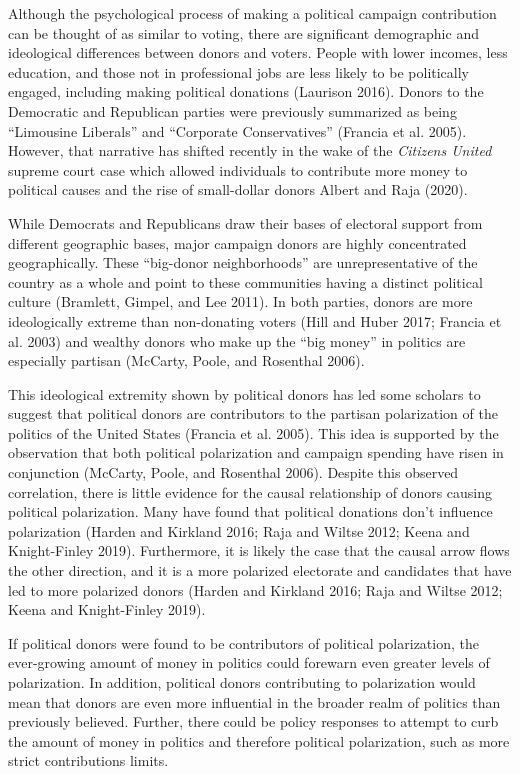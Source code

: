 \documentclass[12pt,]{article}
\begin{document}
Although the psychological process of making a political campaign
contribution can be thought of as similar to voting, there are
significant demographic and ideological differences between donors and
voters. People with lower incomes, less education, and those not in
professional jobs are less likely to be politically engaged, including
making political donations (Laurison 2016). Donors to the Democratic and
Republican parties were previously summarized as being ``Limousine
Liberals'' and ``Corporate Conservatives'' (Francia et al. 2005).
However, that narrative has shifted recently in the wake of the
\emph{Citizens United} supreme court case which allowed individuals to
contribute more money to political causes and the rise of small-dollar
donors Albert and Raja (2020).

While Democrats and Republicans draw their bases of electoral support
from different geographic bases, major campaign donors are highly
concentrated geographically. These ``big-donor neighborhoods'' are
unrepresentative of the country as a whole and point to these
communities having a distinct political culture (Bramlett, Gimpel, and
Lee 2011). In both parties, donors are more ideologically extreme than
non-donating voters (Hill and Huber 2017; Francia et al. 2003) and
wealthy donors who make up the ``big money'' in politics are especially
partisan (McCarty, Poole, and Rosenthal 2006).

This ideological extremity shown by political donors has led some
scholars to suggest that political donors are contributors to the
partisan polarization of the politics of the United States (Francia et
al. 2005). This idea is supported by the observation that both political
polarization and campaign spending have risen in conjunction (McCarty,
Poole, and Rosenthal 2006). Despite this observed correlation, there is
little evidence for the causal relationship of donors causing political
polarization. Many have found that political donations don't influence
polarization (Harden and Kirkland 2016; Raja and Wiltse 2012; Keena and
Knight-Finley 2019). Furthermore, it is likely the case that the causal
arrow flows the other direction, and it is a more polarized electorate
and candidates that have led to more polarized donors (Harden and
Kirkland 2016; Raja and Wiltse 2012; Keena and Knight-Finley 2019).

If political donors were found to be contributors of political
polarization, the ever-growing amount of money in politics could
forewarn even greater levels of polarization. In addition, political
donors contributing to polarization would mean that donors are even more
influential in the broader realm of politics than previously believed.
Further, there could be policy responses to attempt to curb the amount
of money in politics and therefore political polarization, such as more
strict contributions limits.
\end{document}
